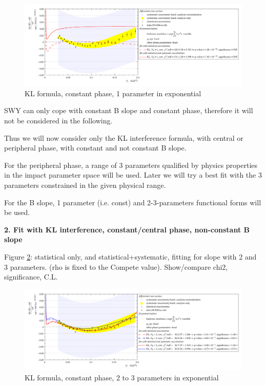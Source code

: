 \begin{figure}
\begin{center}
\includegraphics[width=18cm]{simone/90/KL,con,1,stat-stat+syst.pdf}
\vskip-3mm
\caption{KL formula, constant phase, 1 parameter in exponential}
\label{fig:90,KL,con,1}
\end{center}
\end{figure}

SWY can only cope with constant B slope and constant phase, therefore it will not be
considered in the following.

Thus we will now consider only the KL interference formula, with central or peripheral
phase, with constant and not constant B slope.

For the peripheral phase, a range of 3 parameters qualified by physics properties in the impact
parameter space will be used. Later we will try a best fit with the 3 parameters constrained in
the given physical range.

For the B slope, 1 parameter (i.e. const) and 2-3-parameters functional forms will be used.

{\bf 2. Fit with KL interference, constant/central phase, non-constant B slope}

Figure \ref{fig:90,KL,con,2-3}: statistical only, and statistical+systematic, fitting for slope with 2 and 3 parameters. (rho is
fixed to the Compete value). Show/compare chi2, significance, C.L.

\begin{figure}
\begin{center}
\includegraphics[width=18cm]{simone/90/KL,con,2-3,stat-stat+syst.pdf}
\vskip-3mm
\caption{KL formula, constant phase, 2 to 3 parameters in exponential}
\label{fig:90,KL,con,2-3}
\end{center}
\end{figure}

